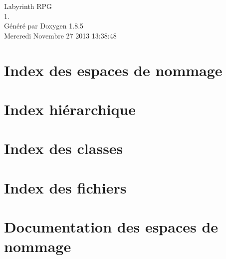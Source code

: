 \documentclass[twoside]{book}
\newcommand{\clearemptydoublepage}{%
  \newpage{\pagestyle{empty}\cleardoublepage}%
}
\begin{document}
\begin{titlepage}
\vspace*{7cm}
\begin{center}%
{\Large Labyrinth R\-P\-G \\[1ex]\large 1. }\\
\vspace*{1cm}
{\large Généré par Doxygen 1.8.5}\\
\vspace*{0.5cm}
{\small Mercredi Novembre 27 2013 13:38:48}\\
\end{center}
\end{titlepage}
\clearemptydoublepage
\tableofcontents
\clearemptydoublepage
{}

\chapter{Index des espaces de nommage}

\chapter{Index hiérarchique}

\chapter{Index des classes}

\chapter{Index des fichiers}

\chapter{Documentation des espaces de nommage}

\end{document}
